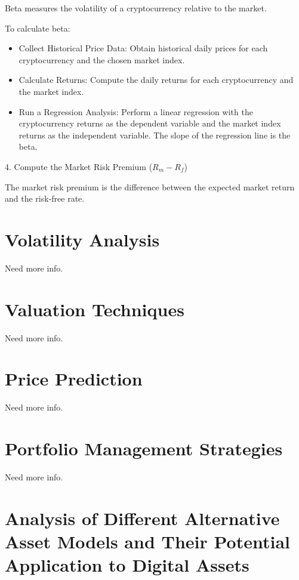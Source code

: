 \documentclass{ledger}
\begin{document}
Beta measures the volatility of a cryptocurrency relative to the market. 

To calculate beta:

\begin{itemize}
    \item Collect Historical Price Data: Obtain historical daily prices for each cryptocurrency and the chosen market index.
    \item Calculate Returns: Compute the daily returns for each cryptocurrency and the market index.
    \item Run a Regression Analysis: Perform a linear regression with the cryptocurrency returns as the dependent variable and the market index returns as the independent variable. The slope of the regression line is the beta.
\end{itemize}

4. Compute the Market Risk Premium (\(R_m - R_f\))

The market risk premium is the difference between the expected market return and the risk-free rate.





\section{Volatility Analysis}

Need more info.

\section{Valuation Techniques}

Need more info.

\section{Price Prediction}

Need more info.

\section{Portfolio Management Strategies}

Need more info.

\section{Analysis of Different Alternative Asset Models and Their Potential Application to Digital Assets}
\end{document}
